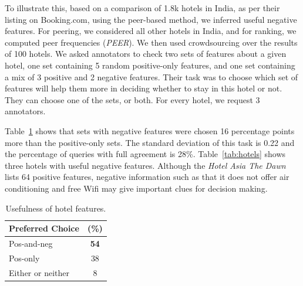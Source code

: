 To illustrate this, based on a comparison of 1.8k hotels in India, as per their listing on Booking.com, using the peer-based method, we inferred useful negative features. For peering, we considered all other hotels in India, and for ranking, we computed peer frequencies (\textit{PEER}). We then used crowdsourcing over the results of 100 hotels. We asked annotators to check two sets of features about a given hotel, one set containing 5 random %
positive-only features, and one set containing a mix of 3 positive and 2 negative features. Their task was to choose which set of features will help them more in deciding whether to stay in this hotel or not. They can choose one of the sets, or both. For every hotel, we request 3 annotators.

Table~\ref{tab:hotelsnumber} shows that sets with negative features were chosen 16 percentage points more than the positive-only sets. The standard deviation of this task is 0.22 and the percentage of queries with full agreement is 28\%. Table~\ref{tab:hotels} shows three hotels with useful negative features. Although the \textit{Hotel Asia The Dawn} lists 64 positive features, negative information such as that it does not offer air conditioning and free Wifi may give important clues for decision making.
\begin{table}
  \caption{Usefulness of hotel features.}
  \centering
  \label{tab:hotelsnumber}
  \begin{tabular}{l|l}
    \toprule
        \multicolumn{1}{c}{\textbf{Preferred Choice}} & 
        \multicolumn{1}{c}{\textbf{(\%)}}\\
            \midrule
    \multicolumn{1}{l}{Pos-and-neg} & \multicolumn{1}{c}{\textbf{54}}\\
    \multicolumn{1}{l}{Pos-only} & \multicolumn{1}{c}{38}\\
    \multicolumn{1}{l}{Either or neither} & \multicolumn{1}{c}{8}\\
    \bottomrule
  \end{tabular}
\end{table}

